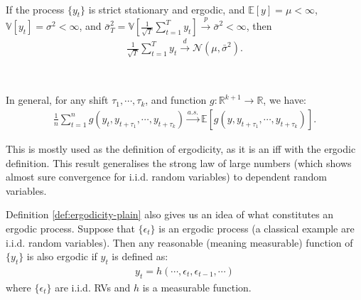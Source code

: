 \begin{proposition}\label{prop:clt-ss-ergodic}
    \
    
    If the process $\{y_t\}$ is strict stationary and ergodic, and $\mathbb{E}[y] = \mu < \infty$,
    $\mathbb{V}[y_t] = \sigma^2 < \infty$, and $\bar{\sigma}_T^2 = \mathbb{V}[\frac{1}{\sqrt{T}}\sum_{t=1}^{T} y_t] \xrightarrow{p} \bar{\sigma}^2 < \infty$,
    then
    \begin{gather*}
        \frac{1}{\sqrt{T}} \sum_{t=1}^{T} y_t \xrightarrow{d} \mathcal{N}(\mu, \bar{\sigma}^2).
    \end{gather*}
\end{proposition}

\begin{definition}\label{def:ergodicity-plain}
    \

    In general, for any shift $\tau_1, \cdots, \tau_k$, and function $g: \mathbb{R}^{k+1} \to \mathbb{R}$,
    we have:
    \begin{gather*}
        \frac{1}{n} \sum_{t=1}^{n} g(y_t, y_{t+\tau_1}, \cdots, y_{t+\tau_k}) \xrightarrow{a.s.} \mathbb{E}[g(y, y_{t+\tau_1}, \cdots, y_{t+\tau_k})].
    \end{gather*}
\end{definition}
This is mostly used as the definition of ergodicity,
as it is an iff with the ergodic definition.
This result generalises the strong law of large numbers
(which shows almost sure convergence for i.i.d. random variables)
to dependent random variables.

Definition \ref{def:ergodicity-plain} also gives us an idea of what constitutes an ergodic process.
Suppose that $\{\epsilon_t\}$ is an ergodic process (a classical example are i.i.d. random variables).
Then any reasonable (meaning measurable) function of $\{y_t\}$ is also ergodic
if $y_t$ is defined as:
\begin{gather*}
    y_t = h(\cdots, \epsilon_t, \epsilon_{t-1}, \cdots)
\end{gather*}
where $\{\epsilon_t\}$ are i.i.d. RVs and $h$ is a measurable function.
